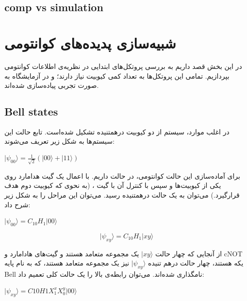 \documentclass{book}
\begin{document}
\section{comp vs simulation}
	

\chapter{شبیه‌سازی پدیده‌های کوانتومی}
در این بخش قصد داریم به بررسی پروتکل‌های ابتدایی در نظریه‌ی اطلاعات کوانتومی بپردازیم. تمامی این پروتکل‌ها به تعداد کمی کیوبیت نیاز دارند؛ و در آزمایشگاه به صورت تجربی پیاده‌سازی شده‌اند. 
\section{Bell states}
در اغلب موارد، سیستم از دو کیوبیت درهمتنیده تشکیل شده‌است. تابع حالت این سیستم‌ها به شکل زیر تعریف می‌شوند:
\begin{center}
	$\vert \psi_{00} \rangle = \frac{1}{\sqrt{2}}(|00\rangle + |11\rangle)$
\end{center}
برای آماده‌سازی این حالت کوانتومی‌، در حالت  داریم. با اعمال یک گیت هدامارد روی یکی از کیوبیت‌ها و سپس با کنترل‌ آن با گیت ، (به نحوی که کیوبیت دوم هدف قرارگیرد.) می‌توان به یک حالت درهمتنیده رسید. می‌توان این مراحل را به شکل زیر شرح داد:
\begin{center}
	$\vert\psi_{00}\rangle = C_{10}H_{1}\vert00\rangle$
\end{center}

\[
\vert\psi_{xy}\rangle = C_{10}H_{1}\vert xy \rangle
\]

از آنجایی که چهار حالت $\vert xy\rangle$ یک مجموعه متعامد هستند و گیت‌های هادامارد و cNOT یکه هستند، چهار حالت درهم تنیده $\vert \psi_{xy}\rangle$ نیز یک مجموعه متعامد هستند، که به نام پایه Bell نامگذاری شده‌اند.  می‌توان رابطه‌ی بالا را یک حالت کلی تعمیم داد:

\begin{center}
$\vert \psi_{xy}\rangle = C10H1X^{x}_{1} X^{y}_{0} \vert00\rangle$\\
\end{center}
\end{document}
